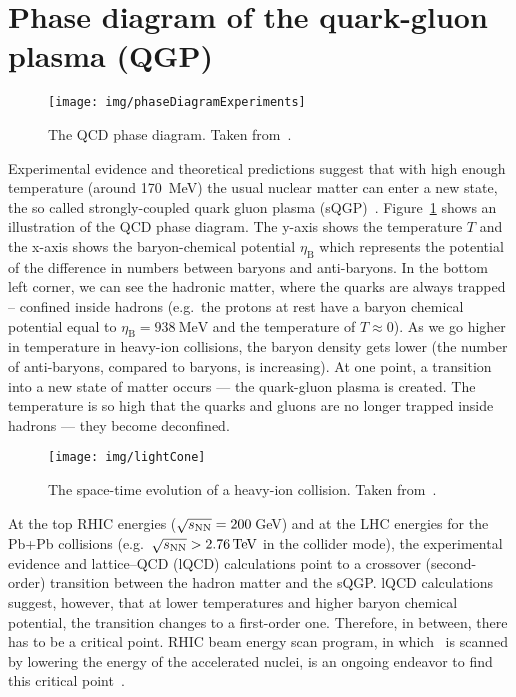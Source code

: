 \section{Phase diagram of the quark-gluon plasma (QGP)}

\begin{figure}[!htb]
\centering
\texttt{[image: img/phaseDiagramExperiments]}
\caption[The QCD phase diagram.]{\label{fig:phaseDiagram}The QCD phase diagram. Taken from~\cite{SumberaPasechnik}.}
\end{figure}
 

Experimental evidence and theoretical predictions suggest that with high enough temperature (around \SI{170}{\mega\electronvolt}) the usual nuclear matter can enter a new state, the so called strongly-coupled quark gluon plasma (sQGP)~\cite{QGPdiscovered}\@. Figure~\ref{fig:phaseDiagram} shows an illustration of the QCD phase diagram. 
 The y-axis shows the temperature $T$ and the x-axis shows the baryon-chemical potential $\eta_\mathrm{B}$ 
which represents the potential of the difference in numbers between baryons and anti-baryons. In the bottom left corner, we can see the hadronic matter, where the quarks are always trapped -- confined inside hadrons (e.g.\ the protons at rest have a baryon chemical potential equal to $\eta_\mathrm{B} = \SI{938}{\mega\electronvolt}$ and the temperature of $T \approx 0$). 
As we go higher in temperature in heavy-ion collisions, the baryon density gets lower (the number of anti-baryons, compared to baryons, is increasing). At one point, a transition into a new state of matter occurs --- the quark-gluon plasma is created. The temperature is so high that the quarks and gluons are no longer trapped inside hadrons --- they become deconfined. 

\begin{figure}[!htb]
\centering
\texttt{[image: img/lightCone]}
\caption[The space-time evolution of a heavy-ion collision.]{The space-time evolution of a heavy-ion collision. Taken from~\cite{helen}.}
\label{fig:lightCone}
\end{figure}

At the top RHIC energies ($\sqrt{s_\text{NN}} = 200\,$GeV) and at the LHC energies for the Pb+Pb collisions (e.g.\ $\snn > \SI{2.76}{\tera\electronvolt}$ in the collider mode), the experimental evidence and lattice--QCD (lQCD) calculations point to a crossover (second-order) transition between the hadron matter and the sQGP\@. lQCD calculations suggest, however, that at lower temperatures and higher baryon chemical potential, the transition changes to a first-order one. Therefore, in between, there has to be a critical point. RHIC beam energy scan program, in which \snn\ is scanned by lowering the energy of the accelerated nuclei, is an ongoing endeavor to find this critical point~\cite{BESII}. 


